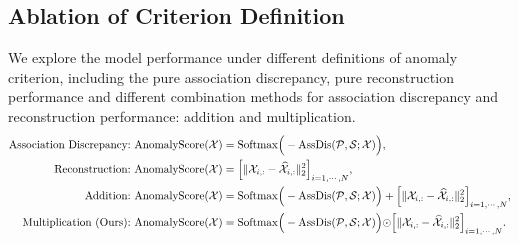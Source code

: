 \documentclass{article} %
\newcommand{\update}[1]{{\textcolor{black}{#1}}}
\begin{document}
\subsection{Ablation of Criterion Definition}
We explore the model performance under different definitions of anomaly criterion, including the pure association discrepancy, pure reconstruction performance and different combination methods for association discrepancy and reconstruction performance: addition and multiplication.
\begin{equation}\label{equ:supp_metric}
  \begin{split}
  \text{Association Discrepancy:\ }&\mathrm{AnomalyScore}(\mathcal{X})=\mathrm{Softmax}\Big(-\mathrm{AssDis}(\mathcal{P},\mathcal{S};\mathcal{X})\Big), \\
  \text{Reconstruction:\ }&\mathrm{AnomalyScore}(\mathcal{X})=\update{\Big[\|\mathcal{X}_{i,:}-{\widehat{\mathcal{X}}}_{i,:}\|_{2}^2\Big]_{i=1,\cdots,N}}, \\
  \text{Addition:\ }&\mathrm{AnomalyScore}(\mathcal{X})=\mathrm{Softmax}\Big(-\mathrm{AssDis}(\mathcal{P},\mathcal{S};\mathcal{X})\Big) +\update{\Big[\|\mathcal{X}_{i,:}-{\widehat{\mathcal{X}}}_{i,:}\|_{2}^2\Big]_{i=1,\cdots,N}}, \\
    \text{Multiplication (Ours):\ }&\mathrm{AnomalyScore}(\mathcal{X})=\mathrm{Softmax}\Big(-\mathrm{AssDis}(\mathcal{P},\mathcal{S};\mathcal{X})\Big)\update{\odot\Big[\|\mathcal{X}_{i,:}-{\widehat{\mathcal{X}}}_{i,:}\|_{2}^2\Big]_{i=1,\cdots,N}}. \\
  \end{split}
\end{equation}
\end{document}
